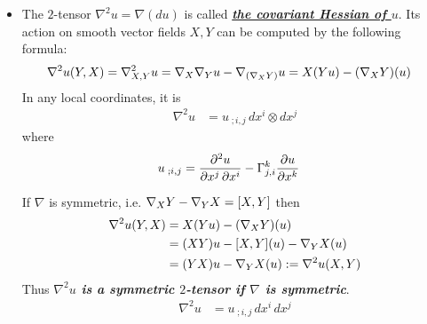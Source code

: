 \documentclass[11pt]{article}
\begin{document}
\begin{itemize}
\begin{example}
\begin{itemize}
\item The $2$-tensor $\nabla^2u = \nabla(du)$  is called \underline{\emph{\textbf{the covariant Hessian of $u$}}}. Its action
on smooth vector fields $X,Y$ can be computed by the following formula:
\begin{align}
\nabla^2u(Y, X) = \nabla_{X, Y}^2 u &= \nabla_{X}{\nabla_{Y}{u}} - \nabla_{(\nabla_{X}{Y})}{u} = X(Yu) - (\nabla_{X}{Y})(u)  \label{eqn: covariant_hessian}
\end{align} In any local coordinates, it is
\begin{align*}
\nabla^2u &= u_{\;;i,j}\,dx^i \otimes dx^j
\end{align*} where 
\begin{align*}
u_{\;;i,j} &= \frac{\partial ^2 u}{ \partial x^j\,\partial x^i} - \Gamma_{j,i}^{k}\frac{\partial u}{ \partial x^k}
\end{align*}

If $\nabla$ is symmetric, i.e. $\nabla_{X}{Y} - \nabla_{Y}{X} = [X, Y]$ then 
\begin{align}
\nabla^2u(Y, X) &=X(Yu) - (\nabla_{X}{Y})(u)    \nonumber\\
&= (XY)u - [X,Y](u) - \nabla_{Y}{X}(u)  \nonumber \\
&= (YX)u - \nabla_{Y}{X}(u)  := \nabla^2u(X, Y) \label{eqn: covariant_hessian_symmetric}
\end{align} Thus \emph{\textbf{$\nabla^2u$ is a symmetric $2$-tensor if $\nabla$ is symmetric}}.
\begin{align*}
\nabla^2u &= u_{\;;i,j}\,dx^i \,dx^j
\end{align*}
\end{itemize}
\end{example}
\end{itemize}
\end{document}
